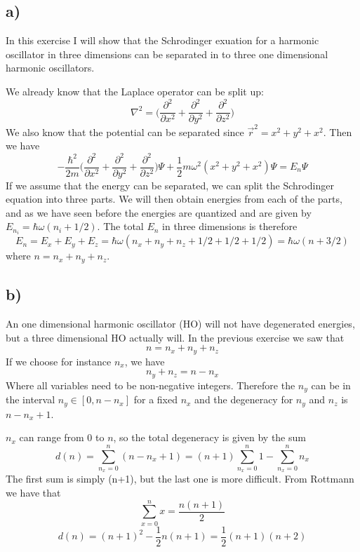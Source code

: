\documentclass{scrartcl}
\begin{document}
\subsection*{a)}
In this exercise I will show that the Schrodinger exuation for a harmonic oscillator in three dimensions can be separated in to three one dimensional harmonic oscillators. \par\vspace{3mm}
We already know that the Laplace operator can be split up:
\begin{equation}
\nabla^2=\bigg(\frac{\partial^2}{\partial x^2}+\frac{\partial^2}{\partial y^2}+\frac{\partial^2}{\partial z^2}\bigg)
\end{equation}
We also know that the potential can be separated since $\vec{r}^2=x^2+y^2+x^2$.
Then we have
\begin{equation}
-\frac{\hbar^2}{2m}\bigg(\frac{\partial^2}{\partial x^2}+\frac{\partial^2}{\partial y^2}+\frac{\partial^2}{\partial z^2}\bigg)\Psi+\frac{1}{2}m\omega^2(x^2+y^2+x^2)\Psi=E_n\Psi
\end{equation}
If we assume that the energy can be separated, we can split the Schrodinger equation into three parts. We will then obtain energies from each of the parts, and as we have seen before the energies are quantized and are given by $E_{n_i}=\hbar\omega(n_i+1/2)$. The total $E_n$ in three dimensions is therefore
\begin{equation}
E_n=E_x+E_y+E_z=\hbar\omega(n_x+n_y+n_z+1/2+1/2+1/2)=\hbar\omega(n+3/2)
\end{equation} 
where $n=n_x+n_y+n_z$.

\subsection*{b)}
An one dimensional harmonic oscillator (HO) will not have degenerated energies, but a three dimensional HO actually will. In the previous exercise we saw that 
\begin{equation}
n=n_x+n_y+n_z
\end{equation}
If we choose for instance $n_x$, we have
$$n_y+n_z=n-n_x$$
Where all variables need to be non-negative integers. Therefore the $n_y$ can be in the interval $n_y\in[0,n-n_x]$ for a fixed $n_x$ and the degeneracy for $n_y$ and $n_z$ is $n-n_x+1$.\par\vspace{3mm}
$n_x$ can range from 0 to $n$, so the total degeneracy is given by the sum
\begin{equation}
d(n)=\sum_{n_x=0}^n (n-n_x+1)=(n+1)\sum_{n_x=0}^n 1-\sum_{n_x=0}^n n_x
\end{equation}
The first sum is simply (n+1), but the last one is more difficult. From Rottmann we have that
\begin{equation}
\sum_{x=0}^n x = \frac{n(n+1)}{2}
\end{equation}
\begin{equation}
d(n)=(n+1)^2-\frac{1}{2}n(n+1)=\frac{1}{2}(n+1)(n+2)
\end{equation}
\end{document}
